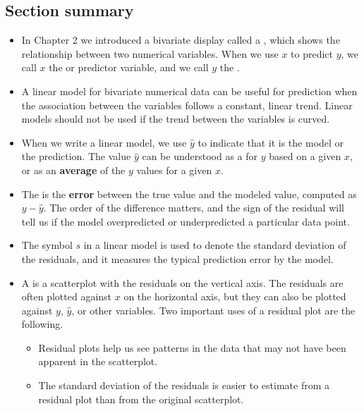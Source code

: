 \subsection*{Section summary}
\begin{itemize}

\item In Chapter 2 we introduced a bivariate display called a , which shows the relationship between two numerical variables.  When we use $x$ to predict $y$, we call $x$ the  or predictor variable, and we call $y$ the .

\item A linear model for bivariate numerical data can be useful for prediction when the association between the variables follows a constant, linear trend.  Linear models should not be used if the trend between the variables is curved.  

\item When we write a linear model, we use $\hat{y}$ to indicate that it is the model or the prediction.   The value $\hat{y}$ can be understood as a  for $y$ based on a given $x$, or as an \textbf{average} of the $y$ values for a given $x$.

\item The  is the \textbf{error} between the true value and the modeled value, computed as $y - \hat{y}$.  The order of the difference matters, and the sign of the residual will tell us if the model overpredicted or underpredicted a particular data point.

\item The symbol $s$ in a linear model is used to denote the standard deviation of the residuals, and it measures the typical prediction error by the model.

\item A  is a scatterplot with the residuals on the vertical axis.  The residuals are often plotted against $x$ on the horizontal axis, but they can also be plotted against $y$, $\hat{y}$, or other variables.  Two important uses of a residual plot are the following.
\begin{itemize}
\item Residual plots help us see patterns in the data that may not have been apparent in the scatterplot.
\item The standard deviation of the residuals is easier to estimate from a residual plot than from the original scatterplot.
\end{itemize}


\end{itemize}

